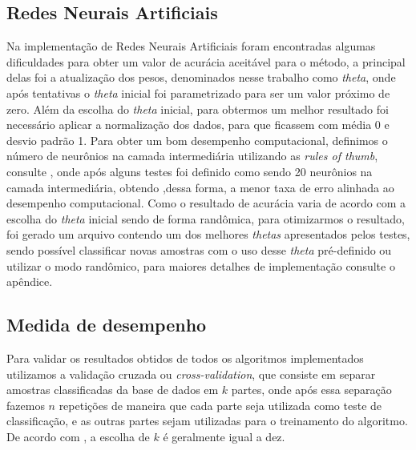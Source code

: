\documentclass[10pt, conference, compsocconf]{IEEEtran}
\begin{document}
\subsection{Redes Neurais Artificiais}
Na implementação de Redes Neurais Artificiais foram encontradas algumas dificuldades para obter um valor de acurácia aceitável para o método, a principal delas foi a atualização dos pesos, denominados nesse trabalho como \textit{theta}, onde após tentativas o \textit{theta} inicial foi parametrizado para ser um valor próximo de zero. 
Além da escolha do \textit{theta} inicial, para obtermos um melhor resultado foi necessário aplicar a normalização dos dados, para que ficassem com média 0 e desvio padrão 1.
Para obter um bom desempenho computacional, definimos o número de neurônios na camada intermediária utilizando as \textit{rules of thumb}, consulte \cite{12}, onde após alguns testes foi definido como sendo 20 neurônios na camada intermediária, obtendo ,dessa forma, a menor taxa de erro alinhada ao desempenho computacional.
Como o resultado de acurácia varia de acordo com a escolha do \textit{theta} inicial sendo de forma randômica, para otimizarmos o resultado, foi gerado um arquivo contendo um dos melhores \textit{thetas} apresentados pelos testes, sendo possível classificar novas amostras com o uso desse \textit{theta} pré-definido ou utilizar o modo randômico, para maiores detalhes de implementação consulte o apêndice.
\subsection{Medida de desempenho}
Para validar os resultados obtidos de todos os algoritmos implementados utilizamos a validação cruzada ou \textit{cross-validation}, que consiste em separar amostras classificadas da base de dados em $k$ partes, onde após essa separação fazemos $n$ repetições de maneira que cada parte seja utilizada como teste de classificação, e as outras partes sejam utilizadas para o treinamento do algoritmo. De acordo com \cite{10}, a escolha de $k$ é geralmente igual a dez.
\end{document}
